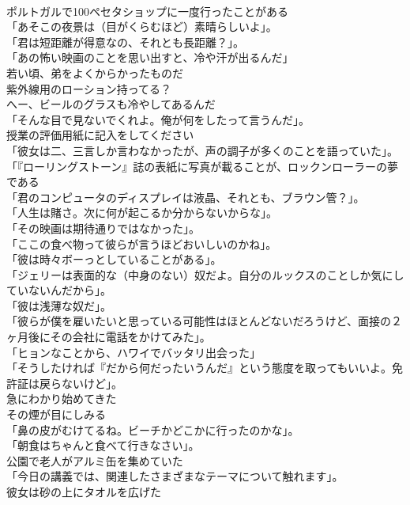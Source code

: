 \documentclass[8pt]{extreport}
\begin{document}
\begin{CJK}{UTF8}{min}
\\	ポルトガルで100ペセタショップに一度行ったことがある	
\\	「あそこの夜景は（目がくらむほど）素晴らしいよ」。	
\\	「君は短距離が得意なの、それとも長距離？」。	
\\	「あの怖い映画のことを思い出すと、冷や汗が出るんだ」	
\\	若い頃、弟をよくからかったものだ	
\\	紫外線用のローション持ってる？	
\\	へー、ビールのグラスも冷やしてあるんだ	
\\	「そんな目で見ないでくれよ。俺が何をしたって言うんだ」。	
\\	授業の評価用紙に記入をしてください	
\\	「彼女は二、三言しか言わなかったが、声の調子が多くのことを語っていた」。	
\\	「『ローリングストーン』誌の表紙に写真が載ることが、ロックンローラーの夢である	
\\	「君のコンピュータのディスプレイは液晶、それとも、ブラウン管？」。	
\\	「人生は賭さ。次に何が起こるか分からないからな」。	
\\	「その映画は期待通りではなかった」。	
\\	「ここの食べ物って彼らが言うほどおいしいのかね」。	
\\	「彼は時々ボーっとしていることがある」。	
\\	「ジェリーは表面的な（中身のない）奴だよ。自分のルックスのことしか気にしていないんだから」。	
\\	「彼は浅薄な奴だ」。	
\\	「彼らが僕を雇いたいと思っている可能性はほとんどないだろうけど、面接の２ヶ月後にその会社に電話をかけてみた」。	
\\	「ヒョンなことから、ハワイでバッタリ出会った」	
\\	「そうしたければ『だから何だったいうんだ』という態度を取ってもいいよ。免許証は戻らないけど」。	
\\	急にわかり始めてきた	
\\	その煙が目にしみる	
\\	「鼻の皮がむけてるね。ビーチかどこかに行ったのかな」。	
\\	「朝食はちゃんと食べて行きなさい」。	
\\	公園で老人がアルミ缶を集めていた	
\\	「今日の講義では、関連したさまざまなテーマについて触れます」。	
\\	彼女は砂の上にタオルを広げた	

\end{CJK}
\end{document}
